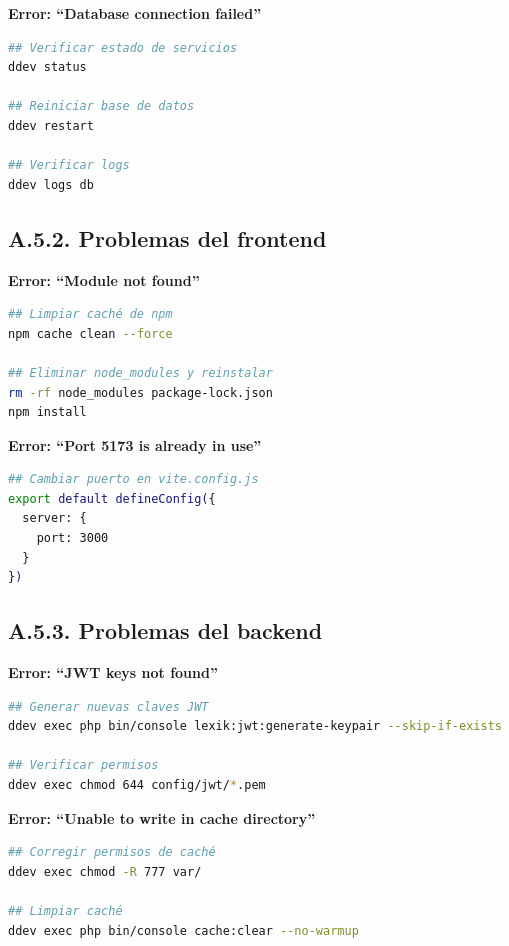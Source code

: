 \documentclass[12pt,a4paper,oneside]{report}
\begin{document}
\textbf{Error: ``Database connection failed''}

\begin{lstlisting}[language=bash]
## Verificar estado de servicios
ddev status

## Reiniciar base de datos
ddev restart

## Verificar logs
ddev logs db
\end{lstlisting}

\subsection{A.5.2. Problemas del
frontend}\label{a.5.2.-problemas-del-frontend}

\textbf{Error: ``Module not found''}

\begin{lstlisting}[language=bash]
## Limpiar caché de npm
npm cache clean --force

## Eliminar node_modules y reinstalar
rm -rf node_modules package-lock.json
npm install
\end{lstlisting}

\textbf{Error: ``Port 5173 is already in use''}

\begin{lstlisting}[language=bash]
## Cambiar puerto en vite.config.js
export default defineConfig({
  server: {
    port: 3000
  }
})
\end{lstlisting}

\subsection{A.5.3. Problemas del
backend}\label{a.5.3.-problemas-del-backend}

\textbf{Error: ``JWT keys not found''}

\begin{lstlisting}[language=bash]
## Generar nuevas claves JWT
ddev exec php bin/console lexik:jwt:generate-keypair --skip-if-exists

## Verificar permisos
ddev exec chmod 644 config/jwt/*.pem
\end{lstlisting}

\textbf{Error: ``Unable to write in cache directory''}

\begin{lstlisting}[language=bash]
## Corregir permisos de caché
ddev exec chmod -R 777 var/

## Limpiar caché
ddev exec php bin/console cache:clear --no-warmup
\end{lstlisting}
\end{document}
